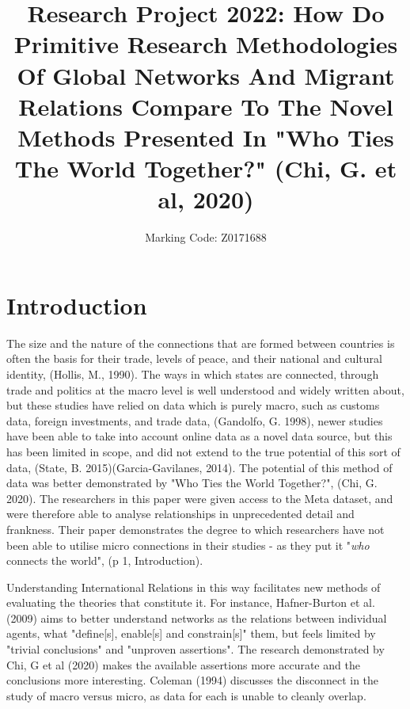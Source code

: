 \documentclass[12pt]{article}
\date{}
\author{Marking Code: Z0171688}
\title{
Research Project 2022: How Do Primitive Research Methodologies Of Global Networks And Migrant Relations 
Compare To The Novel Methods 
Presented In "Who Ties The World Together?" (Chi, G. et al, 2020)
}
\begin{document}
\parindent=20pt

\maketitle

\section{Introduction}

The size and the nature of the connections that are formed between countries is often the 
basis for their trade, levels of peace, and their national and cultural identity, (Hollis, M., 1990). 
The ways in which states are connected, through trade and politics at the macro level is 
well understood and widely written about, but these studies have relied 
on data which is purely macro, such as customs data, foreign investments, and trade 
data, (Gandolfo, G. 1998), newer studies have been able to take into account online data 
as a novel data source, but this has been limited in scope, and did not extend to the
true potential of this sort of data, (State, B. 2015)(Garcia-Gavilanes, 2014).
The potential of this method of data was better demonstrated by "Who Ties the World Together?", (Chi, G. 2020).
The researchers in this paper were given access to the Meta dataset, and were therefore able to 
analyse relationships in unprecedented detail and frankness. Their paper demonstrates the degree
to which researchers have not been able to utilise micro connections in their studies - as they 
put it "\textit{who} connects the world", (p 1, Introduction). 

Understanding International Relations in this way facilitates new methods of evaluating the 
theories that constitute it. For instance, Hafner-Burton et al. (2009) aims to better 
understand networks as the relations between individual agents, what "define[s], enable[s] and 
constrain[s]" them, but feels limited by "trivial conclusions" and "unproven assertions". 
The research demonstrated by Chi, G et al (2020) makes the available assertions more accurate
and the conclusions more interesting. Coleman (1994) discusses the disconnect in the study  
of macro versus micro, as data for each is unable to cleanly overlap.
\end{document}
